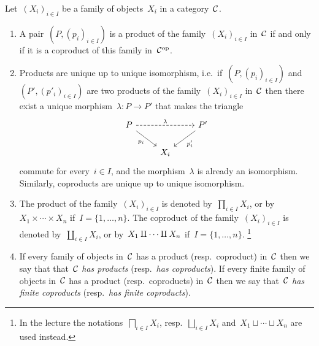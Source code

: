 \begin{remark}
  Let~$(X_i)_{i \in I}$ be a family of objects~$X_i$ in a category~$\mathcal{C}$.
  \begin{enumerate}
    \item
      A pair~$(P,(p_i)_{i \in I})$ is a product of the family~$(X_i)_{i \in I}$ in~$\mathcal{C}$ if and only if it is a coproduct of this family in~$\mathcal{C}^{\mathrm{op}}$.
    \item
      Products are unique up to unique isomorphism, i.e.\ if~$(P, (p_i)_{i \in I})$ and~$(P', (p'_i)_{i \in I})$ are two products of the family~$(X_i)_{i \in I}$ in~$\mathcal{C}$ then there exist a unique morphism~$\lambda \colon P \to P'$ that makes the triangle
      \[
        \begin{tikzcd}
            P
            \arrow[dashed]{rr}[above]{\lambda}
            \arrow{dr}[below left]{p_i}
          & {}
          & P'
            \arrow{dl}[below right]{p'_i}
          \\
            {}
          & X_i
          & {}
        \end{tikzcd}
      \]
      commute for every~$i \in I$, and the morphism~$\lambda$ is already an isomorphism.
      Similarly, coproducts are unique up to unique isomorphism.
    \item
      The product of the family~$(X_i)_{i \in I}$ is denoted by~$\prod_{i \in I} X_i$, or by~$X_1 \times \dotsb \times X_n$ if~$I = \{1, \dotsc, n\}$.
      The coproduct of the family~$(X_i)_{i \in I}$ is denoted by~$\coprod_{i \in I} X_i$, or by~$X_1 \amalg \dotsb \amalg X_n$ if~$I = \{1, \dotsc, n\}$.%
      \footnote{In the lecture the notations~$\bigsqcap_{i \in I} X_i$, resp.~$\bigsqcup_{i \in I} X_i$ and~$X_1 \sqcup \dotsb \sqcup X_n$ are used instead.}
    \item
      If every family of objects in~$\mathcal{C}$ has a product (resp.\ coproduct) in~$\mathcal{C}$ then we say that that~$\mathcal{C}$ \emph{has products} (resp.\ \emph{has coproducts}).
      If every finite family of objects in~$\mathcal{C}$ has a product (resp.\ coproducts) in~$\mathcal{C}$ then we say that~$\mathcal{C}$ \emph{has finite coproducts} (resp.\ \emph{has finite coproducts}).
  \end{enumerate}
\end{remark}


